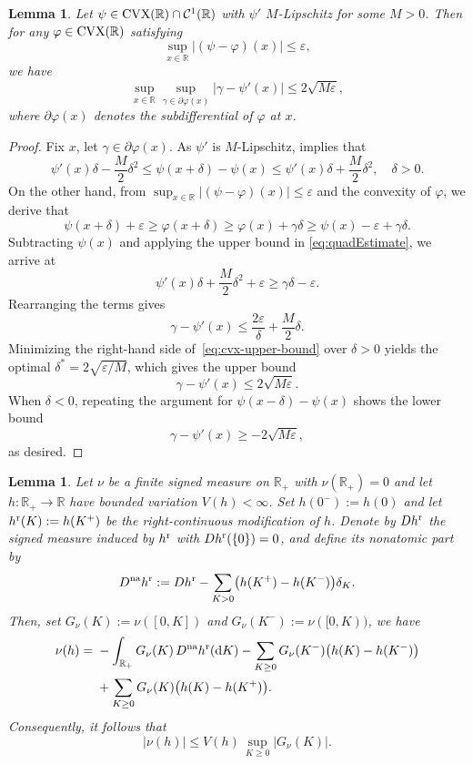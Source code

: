 \documentclass[11pt]{article}
\newcommand{\cC}{\mathcal{C}}
\newcommand{\R}{\mathbb{R}} %
\theoremstyle{plain}
\newtheorem{lemma}[theorem]{Lemma}
\theoremstyle{definition}
\theoremstyle{remark}
\newcommand*{\rd}{\mathrm{d}}
\theoremstyle{plain}
\begin{document}
\begin{lemma}\label{lem:CVXEstimate} 
Let $\psi \in \textnormal{CVX}(\R) \cap \cC^{1}(\R)$ with $\psi'$ $M$-Lipschitz for some $M>0$. Then for any $\varphi \in \textnormal{CVX}(\R)$ satisfying
$$\sup_{x\in \R} |(\psi-\varphi)(x)| \le \varepsilon,$$
we have $$\sup_{x\in \R} \sup_{\gamma\in \partial \varphi(x)}|\gamma - \psi'(x)| \le 2\sqrt{M\varepsilon},$$
where $\partial \varphi(x)$ denotes the subdifferential of $\varphi$ at $x$.
\end{lemma}
\begin{proof}
Fix $x$,  let  $\gamma \in \partial \varphi(x)$. 
As $\psi'$ is $M$-Lipschitz, %
%
\cite[Theorem~9.22]{rockafellar1998variational}  implies that 
\begin{equation}\label{eq:quadEstimate}
     \psi'(x)\delta - \frac{M}{2}\delta^2 \le \psi(x + \delta) - \psi(x) \le  \psi'(x)\delta + \frac{M}{2}\delta^2,\quad \delta>0.
\end{equation}
%
On the other hand, from $\sup_{x\in \R} |(\psi-\varphi)(x)| \le \varepsilon$ and the convexity of $\varphi$, we derive that 
\[
\psi(x + \delta) + \varepsilon \ge \varphi(x + \delta)  \ge \varphi(x) + \gamma \delta \ge \psi(x) - \varepsilon + \gamma \delta.
\]
Subtracting $\psi(x)$ and applying the upper bound in \eqref{eq:quadEstimate},  we arrive at
\[
\psi'(x)\delta + \frac{M}{2}\delta^2 + \varepsilon \ge \gamma \delta - \varepsilon.
\]
Rearranging the terms gives 
\begin{equation}\label{eq:cvx-upper-bound}
     \gamma - \psi'(x) \le \frac{2\varepsilon}{\delta} + \frac{M}{2}\delta.
\end{equation}
Minimizing the right-hand side of~\eqref{eq:cvx-upper-bound} over $\delta>0$ yields the optimal $\delta^* = 2\sqrt{\varepsilon/M}$, which gives the upper bound 
\[\gamma - \psi'(x) \le 2\sqrt{M\varepsilon}.\] When $\delta<0$, repeating the argument for $\psi(x-\delta) - \psi(x)$ shows the lower bound 
\[
\gamma - \psi'(x) \geq -2\sqrt{M\varepsilon},
\]
as desired.
%
\end{proof}

\begin{lemma}\label{lem:BV-ibp}
Let $\nu$ be a finite signed measure on $\R_+$ with $\nu(\R_+)=0$ and let $h:\R_+\to\R$ have bounded variation $V(h)<\infty$. Set $h(0^-):=h(0)$ and let
$h^{\rm r}(K):=h(K^+)$ be the right-continuous modification of $h$. Denote by
$Dh^{\rm r}$ the signed measure induced by
$h^{\rm r}$ with $Dh^{\rm r}(\{0\})=0$, and define its nonatomic part by
\[
D^{\rm na}h^{\rm r}
:=
Dh^{\rm r}
-\sum_{K>0}\bigl(h(K^+)-h(K^-)\bigr)\delta_K.
\]
Then, set $G_\nu(K):=\nu([0,K])$ and $ G_\nu(K^-):=\nu([0,K))$, we have
\[
\begin{aligned}
\nu(h)
={}&-\int_{\R_+}G_\nu(K)\,D^{\rm na}h^{\rm r}(\rd K)
-\sum_{K\ge0}G_\nu(K^-)\bigl(h(K)-h(K^-)\bigr)\\
&+\sum_{K\ge0}G_\nu(K)\bigl(h(K)-h(K^+)\bigr).
\end{aligned}
\]
Consequently, it follows that
\[
|\nu(h)|
\le V(h)\,\sup_{K\ge0}|G_\nu(K)|.
\]
\end{lemma}
\end{document}
